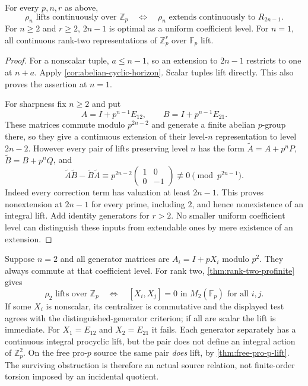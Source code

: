 \begin{corollary}\label{cor:rank-two-sharp-horizon}
For every $p,n,r$ as above,
\[
 \boxed{\rho_n\text{ lifts continuously over }\mathbb Z_p
 \quad\Longleftrightarrow\quad
 \rho_n\text{ extends continuously to }R_{2n-1}.}
\]
For $n\geq2$ and $r\geq2$, $2n-1$ is optimal as a uniform coefficient level. For $n=1$, all continuous rank-two representations of $\mathbb Z_p^r$ over $\mathbb F_p$ lift.
\end{corollary}
\begin{proof}
For a nonscalar tuple, $a\leq n-1$, so an extension to $2n-1$ restricts to one at $n+a$. Apply \cref{cor:abelian-cyclic-horizon}. Scalar tuples lift directly. This also proves the assertion at $n=1$.

For sharpness fix $n\geq2$ and put
\[
 A=I+p^{n-1}E_{12},\qquad B=I+p^{n-1}E_{21}.
\]
These matrices commute modulo $p^{2n-2}$ and generate a finite abelian $p$-group there, so they give a continuous extension of their level-$n$ representation to level $2n-2$. However every pair of lifts preserving level $n$ has the form
$\widetilde A=A+p^nP$, $\widetilde B=B+p^nQ$, and
\[
 \widetilde A\widetilde B-\widetilde B\widetilde A
 \equiv p^{2n-2}
 \begin{pmatrix}1&0\\0&-1\end{pmatrix}
 \not\equiv0\pmod{p^{2n-1}}.
\]
Indeed every correction term has valuation at least $2n-1$. This proves nonextension at $2n-1$ for every prime, including $2$, and hence nonexistence of an integral lift. Add identity generators for $r>2$. No smaller uniform coefficient level can distinguish these inputs from extendable ones by mere existence of an extension.
\end{proof}

\begin{example}\label{ex:abelian-tangent}
Suppose $n=2$ and all generator matrices are $A_i=I+pX_i$ modulo $p^2$. They always commute at that coefficient level. For rank two, \cref{thm:rank-two-profinite} gives
\[
 \rho_2\text{ lifts over }\mathbb Z_p
 \quad\Longleftrightarrow\quad
 [X_i,X_j]=0\text{ in }M_2(\mathbb F_p)\text{ for all }i,j.
\]
If some $X_i$ is nonscalar, its centralizer is commutative and the displayed test agrees with the distinguished-generator criterion; if all are scalar the lift is immediate. For $X_1=E_{12}$ and $X_2=E_{21}$ it fails. Each generator separately has a continuous integral procyclic lift, but the pair does not define an integral action of $\mathbb Z_p^2$. On the free pro-$p$ source the same pair \emph{does} lift, by \cref{thm:free-pro-p-lift}. The surviving obstruction is therefore an actual source relation, not finite-order torsion imposed by an incidental quotient.
\end{example}

